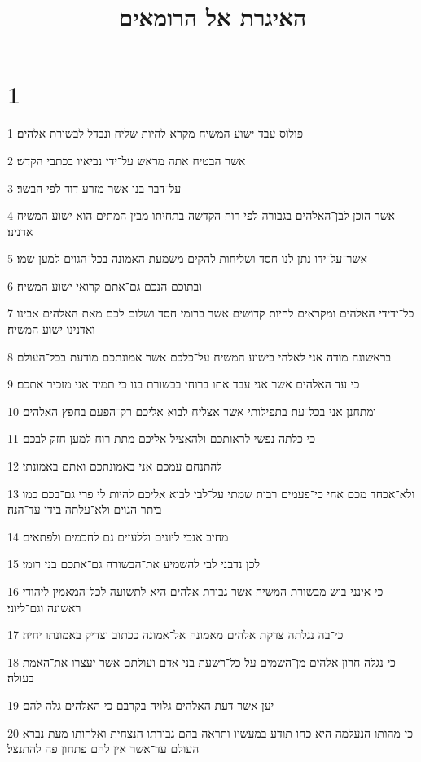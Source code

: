 

\title{האיגרת אל הרומאים}


\chapter{1}

\par 1 פולוס עבד ישוע המשיח מקרא להיות שליח ונבדל לבשורת אלהים׃
\par 2 אשר הבטיח אתה מראש על־ידי נביאיו בכתבי הקדש׃
\par 3 על־דבר בנו אשר מזרע דוד לפי הבשר׃
\par 4 אשר הוכן לבן־האלהים בגבורה לפי רוח הקדשה בתחיתו מבין המתים הוא ישוע המשיח אדנינו׃
\par 5 אשר־על־ידו נתן לנו חסד ושליחות להקים משמעת האמונה בכל־הגוים למען שמו׃
\par 6 ובתוכם הנכם גם־אתם קרואי ישוע המשיח׃
\par 7 כל־ידידי האלהים ומקראים להיות קדושים אשר ברומי חסד ושלום לכם מאת האלהים אבינו ואדנינו ישוע המשיח׃
\par 8 בראשונה מודה אני לאלהי בישוע המשיח על־כלכם אשר אמונתכם מודעת בכל־העולם׃
\par 9 כי עד האלהים אשר אני עבד אתו ברוחי בבשורת בנו כי תמיד אני מזכיר אתכם׃
\par 10 ומתחנן אני בכל־עת בתפילותי אשר אצליח לבוא אליכם רק־הפעם בחפץ האלהים׃
\par 11 כי כלתה נפשי לראותכם ולהאציל אליכם מתת רוח למען חזק לבכם׃
\par 12 להתנחם עמכם אני באמונתכם ואתם באמונתי׃
\par 13 ולא־אכחד מכם אחי כי־פעמים רבות שמתי על־לבי לבוא אליכם להיות לי פרי גם־בכם כמו ביתר הגוים ולא־עלתה בידי עד־הנה׃
\par 14 מחיב אנכי ליונים וללעזים גם לחכמים ולפתאים׃
\par 15 לכן נדבני לבי להשמיע את־הבשורה גם־אתכם בני רומי׃
\par 16 כי אינני בוש מבשורת המשיח אשר גבורת אלהים היא לתשועה לכל־המאמין ליהודי ראשונה וגם־ליוני׃
\par 17 כי־בה נגלתה צדקת אלהים מאמונה אל־אמונה ככתוב וצדיק באמונתו יחיה׃
\par 18 כי נגלה חרון אלהים מן־השמים על כל־רשעת בני אדם ועולתם אשר יעצרו את־האמת בעולה׃
\par 19 יען אשר דעת האלהים גלויה בקרבם כי האלהים גלה להם׃
\par 20 כי מהותו הנעלמה היא כחו תודע במעשיו ותראה בהם גבורתו הנצחית ואלהותו מעת נברא העולם עד־אשר אין להם פתחון פה להתנצל׃
